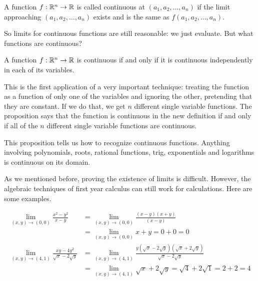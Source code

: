 \documentclass[fleqn,letterpaper]{report}
\begin{document}
\begin{defn}
A function $f: \mathbb{R}^n \rightarrow \mathbb{R}$ is called continuous at
$(a_1, a_2, \ldots, a_n)$ if the limit approaching $(a_1,a_2,
\ldots, a_n)$ exists and is the same as $f(a_1,a_2, \ldots,
a_n)$.
\end{defn} 

So limits for continuous functions are still reasonable: we
just evaluate. But what functions are continuous?

\begin{prop}
A function $f: \mathbb{R}^n \rightarrow \mathbb{R}$ is continuous if and
only if it is continuous independently in each of its
variables.
\end{prop}

This is the first application of a very important technique:
treating the function as a function of only one of the
variables and ignoring the other, pretending that they are
constant. If we do that, we get $n$ different single variable
functions. The proposition says that the function is
continuous in the new definition if and only if all of the $n$
different single variable functions are continuous.

This proposition tells us how to recognize continuous
functions.  Anything involving polynomials, roots, rational
functions, trig, exponentials and logarithms is continuous on
its domain.

As we mentioned before, proving the existence of limits is
difficult. However, the algebraic techniques of first year
calculus can still work for calculations. Here are some
examples.

\begin{example}
\begin{align*}
\lim_{(x,y) \rightarrow (0,0)} \frac{x^2 - y^2}{x-y} & = 
\lim_{(x,y) \rightarrow (0,0)} \frac{(x-y)(x+y)}{(x-y)} \\
& = \lim_{(x,y) \rightarrow (0,0)} x+y = 0 + 0 = 0 \\
\lim_{(x,y) \rightarrow (4,1)} \frac{ xy - 4y^2}{\sqrt{x} -
2\sqrt{y}} & = 
\lim_{(x,y) \rightarrow (4,1)} \frac{y(\sqrt{x} -
2\sqrt{y})(\sqrt{x} + 2 \sqrt{y})}{\sqrt{x} - 2\sqrt{y}} \\
& = \lim_{(x,y) \rightarrow (4,1)} \sqrt{x} + 2 \sqrt{y} =
\sqrt{4} + 2 \sqrt{1} = 2 + 2 = 4 
\end{align*}
\end{example} 
\end{document}
